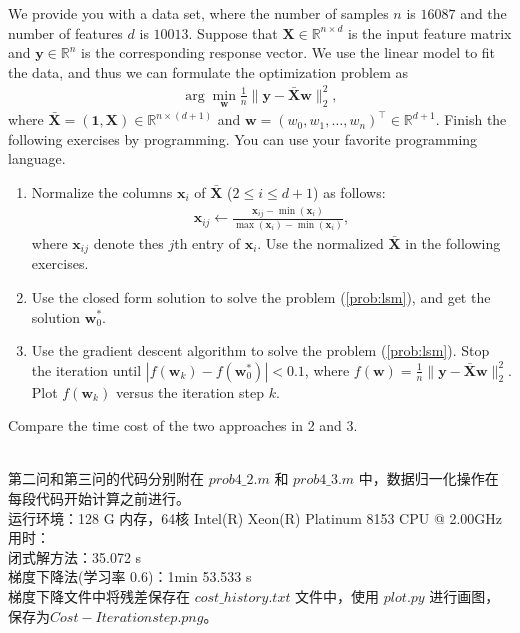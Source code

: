 \documentclass[11pt,letter,notitlepage]{article}
\begin{document}
\begin{exercise}
    We provide you with a data set, where the number of samples $n$ is $16087$ and the number of features $d$ is $10013$. Suppose that $\textbf{X}\in\mathbb{R}^{n\times d}$ is the input feature matrix and $\textbf{y}\in\mathbb{R}^n$ is the corresponding response vector. We use the linear model to fit the data, and thus we can formulate the optimization problem as 
    \begin{align}\label{prob:lsm}
        \arg\min_{\textbf{w}} \frac{1}{n}\|\textbf{y}-\bar{\textbf{X}}\textbf{w}\|_2^2,
    \end{align}
    where $\bar{\textbf{X}}=(\textbf{1},\textbf{X})\in\mathbb{R}^{n\times(d+1)}$ and $\textbf{w}=(w_0,w_1,\dots,w_n)^\top\in\mathbb{R}^{d+1}$.
    Finish the following exercises by programming. You can use your favorite programming language.
    \begin{enumerate}
        \item Normalize the columns $\textbf{x}_i$ of $\bar{\textbf{X}}$ ($2\le i\le d+1$) as follows:
        \begin{align*}
            \textbf{x}_{ij}\leftarrow\frac{\textbf{x}_{ij}-\min (\textbf{x}_i)}{\max (\textbf{x}_i)-\min (\textbf{x}_i)},
        \end{align*}
        where $\textbf{x}_{ij}$ denote thes $j$th entry of $\textbf{x}_i$. Use the normalized $\bar{\textbf{X}}$ in the following exercises.
        \item Use the closed form solution to solve the problem (\ref{prob:lsm}), and get the solution $\textbf{w}_0^*$.
        \item Use the gradient descent algorithm to solve the problem (\ref{prob:lsm}). Stop the iteration until $|f(\textbf{w}_k)-f(\textbf{w}_0^*)|<0.1$, where $f(\textbf{w}) = \frac{1}{n}\|\textbf{y}-\bar{\textbf{X}}\textbf{w} \|_2^2$. Plot $f(\textbf{w}_k)$ versus the iteration step $k$. 
    \end{enumerate}
    Compare the time cost of the two approaches in 2 and 3.
    
\end{exercise}
\begin{solution}
    \heiti
    \ \\
    第二问和第三问的代码分别附在 $prob4\_2.m$ 和 $prob4\_3.m$ 中，数据归一化操作在每段代码开始计算之前进行。\\
    运行环境：128 G 内存，64核 Intel(R) Xeon(R) Platinum 8153 CPU @ 2.00GHz\\
    用时：\\闭式解方法：35.072 s \\
    梯度下降法(学习率 0.6)：1min 53.533 s\\ 
    梯度下降文件中将残差保存在 $cost\_history.txt$ 文件中，使用 $plot.py$ 进行画图，保存为$Cost-Iteration step.png$。
\end{solution}
\end{document}
